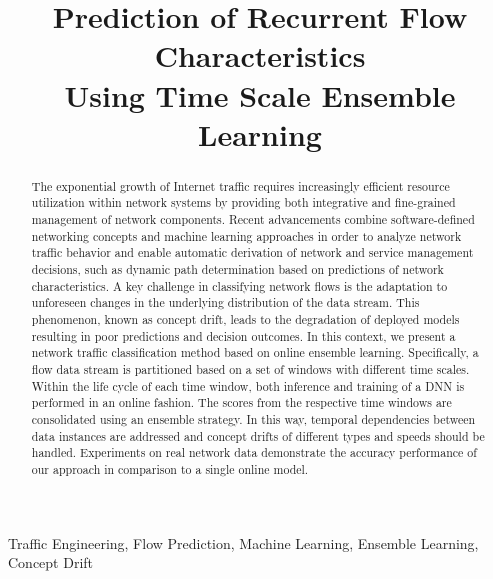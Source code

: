 \documentclass[conference]{IEEEtran}
\begin{document}
\title{Prediction of Recurrent Flow Characteristics \\ Using Time Scale Ensemble Learning}

\author{
\and
{}
}

\maketitle

\begin{abstract}
The exponential growth of Internet traffic requires increasingly efficient resource utilization within network systems by providing both integrative and fine-grained management of network components. Recent advancements combine software-defined networking concepts and machine learning approaches in order to analyze network traffic behavior and enable automatic derivation of network and service management decisions, such as dynamic path determination based on predictions of network characteristics. A key challenge in classifying network flows is the adaptation to unforeseen changes in the underlying distribution of the data stream. This phenomenon, known as concept drift, leads to the degradation of deployed models resulting in poor predictions and decision outcomes. In this context, we present a network traffic classification method based on online ensemble learning. Specifically, a flow data stream is partitioned based on a set of windows with different time scales. Within the life cycle of each time window, both inference and training of a DNN is performed in an online fashion. The scores from the respective time windows are consolidated using an ensemble strategy. In this way, temporal dependencies between data instances are addressed and concept drifts of different types and speeds should be handled. Experiments on real network data demonstrate the accuracy performance of our approach in comparison to a single online model.
\end{abstract}

\begin{IEEEkeywords} Traffic Engineering, Flow Prediction, Machine Learning, Ensemble Learning, Concept Drift \end{IEEEkeywords}
\end{document}
